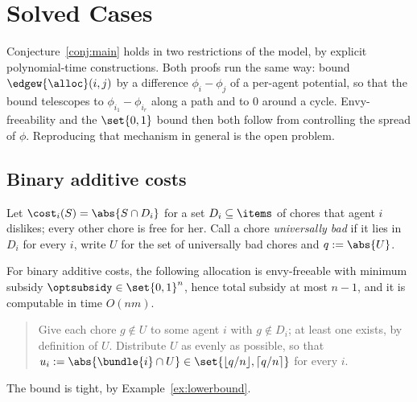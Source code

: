 \section{Solved Cases}
\label{sec:solved}

Conjecture~\ref{conj:main} holds in two restrictions of the model, by explicit
polynomial-time constructions. Both proofs run the same way: bound
$\edgew{\alloc}(i,j)$ by a difference $\phi_i - \phi_j$ of a per-agent potential,
so that the bound telescopes to $\phi_{i_1} - \phi_{i_r}$ along a path and to
$0$ around a cycle. Envy-freeability and the $\set{0,1}$ bound then both follow
from controlling the spread of $\phi$. Reproducing that mechanism in general is
the open problem.

\subsection{Binary additive costs}
\label{sec:binadd}

Let $\cost_i(S) = \abs{S \cap D_i}$ for a set $D_i \subseteq \items$ of chores
that agent $i$ dislikes; every other chore is free for her. Call a chore
\emph{universally bad} if it lies in $D_i$ for every $i$, write $U$ for the set
of universally bad chores and $q := \abs{U}$.

\begin{theorem}
\label{thm:binadd}
For binary additive costs, the following allocation is envy-freeable with
minimum subsidy $\optsubsidy \in \set{0,1}^n$, hence total subsidy at most
$n-1$, and it is computable in time $O(nm)$.
\begin{quote}
Give each chore $g \notin U$ to some agent $i$ with $g \notin D_i$; at least one
exists, by definition of $U$. Distribute $U$ as evenly as possible, so that
$u_i := \abs{\bundle{i} \cap U} \in \set{\lfloor q/n \rfloor, \lceil q/n \rceil}$
for every $i$.
\end{quote}
The bound is tight, by Example~\ref{ex:lowerbound}.
\end{theorem}


